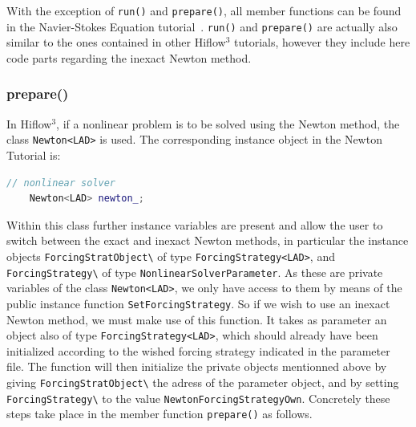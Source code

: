 \documentclass[a4paper, 11pt, twoside]{article}
\begin{document}
With the exception of \verb+run()+ and \verb+prepare()+, all member functions can be found in the Navier-Stokes Equation tutorial~\cite{Tut}. \verb+run()+ and \verb+prepare()+ are actually also similar to the ones contained in other Hiflow$^3$ tutorials, however they include here code parts regarding the inexact Newton method. 

\subsubsection{prepare()}
In Hiflow$^3$, if a nonlinear problem is to be solved using the Newton method, the class \verb+Newton<LAD>+ is used. The corresponding instance object in the Newton Tutorial is:
\begin{lstlisting}[language=C++, basicstyle={\footnotesize, \ttfamily}, keywordstyle=\color{blue}, numbers=none, tabsize=4]    
	// nonlinear solver
    Newton<LAD> newton_;
\end{lstlisting}
Within this class further instance variables are present and allow the user to switch between the exact and inexact Newton methods, in particular the instance objects \verb+ForcingStratObject\+ of type \verb+ForcingStrategy<LAD>+, and \verb+ForcingStrategy\+ of type \verb+NonlinearSolverParameter+. 
As these are private variables of the class \verb+Newton<LAD>+, we only have access to them by means of the public instance function \verb+SetForcingStrategy+. So if we wish to use an inexact Newton method, we must make use of this function. It takes as parameter an object also of type \verb+ForcingStrategy<LAD>+, which should already have been initialized according to the wished forcing strategy indicated in the parameter file. The function will then initialize the private objects mentionned above by giving \verb+ForcingStratObject\+ the adress of the parameter object, and by setting \verb+ForcingStrategy\+ to the value \verb+NewtonForcingStrategyOwn+. Concretely these steps take place in the member function \verb+prepare()+ as follows.
\end{document}
